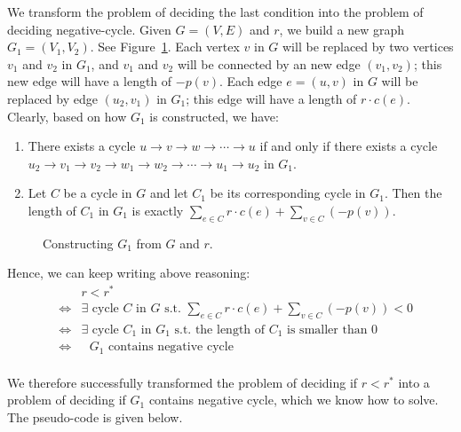 We transform the problem of deciding the last condition into the problem of deciding negative-cycle.
Given $G = (V, E)$ and $r$, we build a new graph $G_1 = (V_1, V_2)$. See Figure~\ref{fig:cycle}.
Each vertex $v$ in $G$ will be replaced by two vertices $v_1$ and $v_2$ in $G_1$, and $v_1$ and $v_2$ will be connected by an new
edge $(v_1, v_2)$; this new edge will have a length of $-p(v)$. 
Each edge $e = (u,v)$ in $G$ will be replaced by edge $(u_2, v_1)$ in $G_1$; this edge will have a length of $r\cdot c(e)$.
Clearly, based on how $G_1$ is constructed, we have:
\vspace*{-\topsep}
\begin{enumerate}
\item There exists a cycle $u \to v \to w \to \cdots \to u$ if and only if there exists a cycle $u_2 \to v_1 \to v_2 \to w_1 \to w_2 \to \cdots \to u_1 \to u_2$ in $G_1$.
\item Let $C$ be a cycle in $G$ and let $C_1$ be its corresponding cycle in $G_1$. Then the length of $C_1$ in $G_1$ is 
exactly $\sum_{e\in C} r\cdot c(e) + \sum_{v\in C} (-p(v))$.
\end{enumerate}

\begin{figure}[h]
\centering{}
\vspace{-2.6cm}
\caption{Constructing $G_1$ from $G$ and $r$.}
\label{fig:cycle}
\end{figure}


Hence, we can keep writing above reasoning:
\begin{eqnarray*}
& & r < r^* \\
& \Longleftrightarrow & \exists \textrm{ cycle } C \textrm{ in $G$ s.t.\ } \textstyle \sum_{e\in C} r\cdot c(e) + \sum_{v\in C} (-p(v)) < 0 \\
& \Longleftrightarrow & \exists \textrm{ cycle } C_1 \textrm{ in $G_1$ s.t.\ the length of $C_1$ is smaller than 0 } \\
& \Longleftrightarrow & \textrm{ $G_1$ contains negative cycle } \\
\end{eqnarray*}

We therefore successfully transformed the problem of deciding if $r < r^*$ into a problem of deciding if $G_1$ contains negative cycle,
which we know how to solve.
The pseudo-code is given below.

\begin{minipage}{0.8\textwidth}
	\xxx
	\xxx
	\xxx
	\xxx
	\xxx
	\xxx
\end{minipage}

